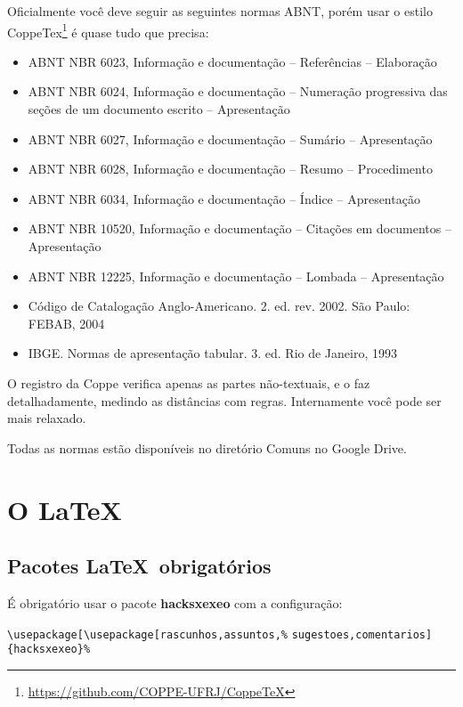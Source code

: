 \documentclass{article}
\begin{document}
\begin{itemize}
Oficialmente você deve seguir as seguintes normas ABNT, porém usar o estilo CoppeTex\footnote{\url{https://github.com/COPPE-UFRJ/CoppeTeX}} é quase tudo que precisa:
\begin{itemize}
    \item ABNT NBR 6023, Informação e documentação – Referências – Elaboração
\item ABNT NBR 6024, Informação e documentação – Numeração progressiva das seções de um documento
escrito – Apresentação
\item ABNT NBR 6027, Informação e documentação – Sumário – Apresentação
\item ABNT NBR 6028, Informação e documentação – Resumo – Procedimento
\item ABNT NBR 6034, Informação e documentação – Índice – Apresentação
\item ABNT NBR 10520, Informação e documentação – Citações em documentos – Apresentação
\item ABNT NBR 12225, Informação e documentação – Lombada – Apresentação
\item Código de Catalogação Anglo-Americano. 2. ed. rev. 2002. São Paulo: FEBAB, 2004
\item IBGE. Normas de apresentação tabular. 3. ed. Rio de Janeiro, 1993
\end{itemize}

O registro da Coppe verifica apenas as partes não-textuais, e o faz detalhadamente, medindo as distâncias com regras. Internamente você pode ser mais relaxado. 

Todas as normas estão disponíveis no diretório Comuns no Google Drive.
    
\end{itemize}





\section{O \LaTeX}

\subsection{Pacotes \LaTeX\  obrigatórios}

É obrigatório usar o pacote \textbf{hacksxexeo} com a configuração:

\verb!\usepackage[\usepackage[rascunhos,assuntos,%!
\verb!sugestoes,comentarios]{hacksxexeo}%!
\end{document}
